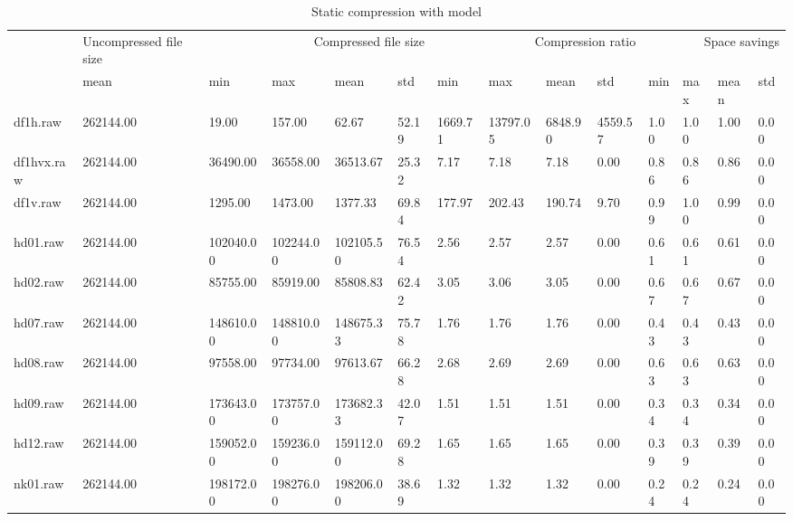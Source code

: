 \begin{table}
\caption{Static compression with model}
\begin{tabular}{llllllllllllll}
 & Uncompressed file size & \multicolumn{4}{r}{Compressed file size} & \multicolumn{4}{r}{Compression ratio} & \multicolumn{4}{r}{Space savings} \\
 & mean & min & max & mean & std & min & max & mean & std & min & max & mean & std \\
df1h.raw & 262144.00 & 19.00 & 157.00 & 62.67 & 52.19 & 1669.71 & 13797.05 & 6848.90 & 4559.57 & 1.00 & 1.00 & 1.00 & 0.00 \\
df1hvx.raw & 262144.00 & 36490.00 & 36558.00 & 36513.67 & 25.32 & 7.17 & 7.18 & 7.18 & 0.00 & 0.86 & 0.86 & 0.86 & 0.00 \\
df1v.raw & 262144.00 & 1295.00 & 1473.00 & 1377.33 & 69.84 & 177.97 & 202.43 & 190.74 & 9.70 & 0.99 & 1.00 & 0.99 & 0.00 \\
hd01.raw & 262144.00 & 102040.00 & 102244.00 & 102105.50 & 76.54 & 2.56 & 2.57 & 2.57 & 0.00 & 0.61 & 0.61 & 0.61 & 0.00 \\
hd02.raw & 262144.00 & 85755.00 & 85919.00 & 85808.83 & 62.42 & 3.05 & 3.06 & 3.05 & 0.00 & 0.67 & 0.67 & 0.67 & 0.00 \\
hd07.raw & 262144.00 & 148610.00 & 148810.00 & 148675.33 & 75.78 & 1.76 & 1.76 & 1.76 & 0.00 & 0.43 & 0.43 & 0.43 & 0.00 \\
hd08.raw & 262144.00 & 97558.00 & 97734.00 & 97613.67 & 66.28 & 2.68 & 2.69 & 2.69 & 0.00 & 0.63 & 0.63 & 0.63 & 0.00 \\
hd09.raw & 262144.00 & 173643.00 & 173757.00 & 173682.33 & 42.07 & 1.51 & 1.51 & 1.51 & 0.00 & 0.34 & 0.34 & 0.34 & 0.00 \\
hd12.raw & 262144.00 & 159052.00 & 159236.00 & 159112.00 & 69.28 & 1.65 & 1.65 & 1.65 & 0.00 & 0.39 & 0.39 & 0.39 & 0.00 \\
nk01.raw & 262144.00 & 198172.00 & 198276.00 & 198206.00 & 38.69 & 1.32 & 1.32 & 1.32 & 0.00 & 0.24 & 0.24 & 0.24 & 0.00 \\
\end{tabular}
\end{table}

